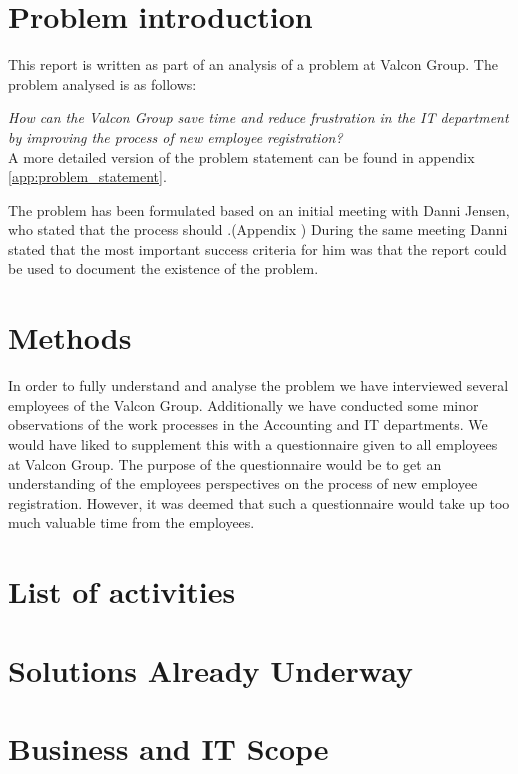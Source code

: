 \section{Problem introduction}
This report is written as part of an analysis of a problem at Valcon Group.
The problem analysed is as follows:

\emph{How can the Valcon Group save time and reduce frustration in the IT department by improving the process of new employee registration?}
\\
A more detailed version of the problem statement can be found in appendix \ref{app:problem_statement}.

The problem has been formulated based on an initial meeting with Danni Jensen, who stated that the process should .(Appendix )
During the same meeting Danni stated that the most important success criteria for him was that the report could be used to document the existence of the problem.

\section{Methods}
In order to fully understand and analyse the problem we have interviewed several employees of the Valcon Group.
Additionally we have conducted some minor observations of the work processes in the Accounting and IT departments.
We would have liked to supplement this with a questionnaire given to all employees at Valcon Group.
The purpose of the questionnaire would be to get an understanding of the employees perspectives on the process of new employee registration.
However, it was deemed that such a questionnaire would take up too much valuable time from the employees.
\section{List of activities}


\section{Solutions Already Underway}


\section{Business and IT Scope}

